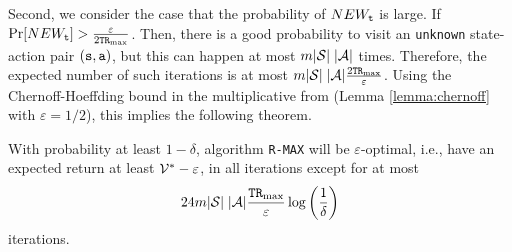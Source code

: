 Second, we consider the case that the probability of $NEW_{\tt t}$ is large.
If $\Pr[NEW_{\tt t}] > \frac{\varepsilon}{2{\tt T}{\tt R}_{\max }}$. Then, there is a good
probability to visit an \texttt{unknown} state-action pair $({\tt s},{\tt a})$, but this
can happen at most $m|\mathcal{S}|\;|\mathcal{A}|$ times. Therefore, the expected
number of such iterations is at most
$m|\mathcal{S}|\;|\mathcal{A}|\frac{2{\tt T}{\tt R}_{\max }}{\varepsilon}$. Using the Chernoff-Hoeffding bound in the multiplicative from (Lemma \ref{lemma:chernoff} with $\varepsilon=1/2$), 
this implies the following theorem.


\begin{theorem}
With probability at least $1-\delta$, algorithm \texttt{R-MAX} will  be $\varepsilon$-optimal, i.e., have an expected return at least  $\mathcal{V}^*-\varepsilon$, in all iterations except for at most 
\[
24 m|\mathcal{S}|\;|\mathcal{A}|\frac{{\tt T}{\tt R}_{\max }}{\varepsilon} \log\left(\frac{1}{\delta}\right)
\]
iterations.
\end{theorem}



